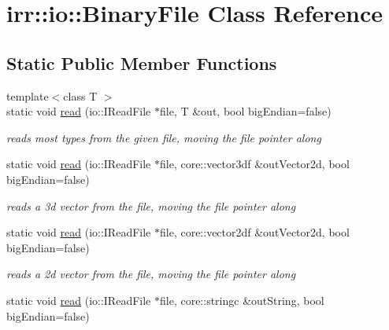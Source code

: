 \hypertarget{classirr_1_1io_1_1_binary_file}{\section{irr\-:\-:io\-:\-:Binary\-File Class Reference}
\label{classirr_1_1io_1_1_binary_file}
}
\subsection*{Static Public Member Functions}
\begin{DoxyCompactItemize}
\item 
\hypertarget{classirr_1_1io_1_1_binary_file_a1c616b172ba986fc3b56a2180666abc1}{{\footnotesize template$<$class T $>$ }\\static void \hyperlink{classirr_1_1io_1_1_binary_file_a1c616b172ba986fc3b56a2180666abc1}{read} (io\-::\-I\-Read\-File $\ast$file, T \&out, bool big\-Endian=false)}\label{classirr_1_1io_1_1_binary_file_a1c616b172ba986fc3b56a2180666abc1}

\begin{DoxyCompactList}\small\item\em reads most types from the given file, moving the file pointer along \end{DoxyCompactList}\item 
\hypertarget{classirr_1_1io_1_1_binary_file_af26d578fdd6a4bb3903e866c1802537f}{static void \hyperlink{classirr_1_1io_1_1_binary_file_af26d578fdd6a4bb3903e866c1802537f}{read} (io\-::\-I\-Read\-File $\ast$file, core\-::vector3df \&out\-Vector2d, bool big\-Endian=false)}\label{classirr_1_1io_1_1_binary_file_af26d578fdd6a4bb3903e866c1802537f}

\begin{DoxyCompactList}\small\item\em reads a 3d vector from the file, moving the file pointer along \end{DoxyCompactList}\item 
\hypertarget{classirr_1_1io_1_1_binary_file_ad33a0cf46e300b86d314564e4c9b894e}{static void \hyperlink{classirr_1_1io_1_1_binary_file_ad33a0cf46e300b86d314564e4c9b894e}{read} (io\-::\-I\-Read\-File $\ast$file, core\-::vector2df \&out\-Vector2d, bool big\-Endian=false)}\label{classirr_1_1io_1_1_binary_file_ad33a0cf46e300b86d314564e4c9b894e}

\begin{DoxyCompactList}\small\item\em reads a 2d vector from the file, moving the file pointer along \end{DoxyCompactList}\item 
\hypertarget{classirr_1_1io_1_1_binary_file_af6f58cf4535d0728d4b61a5b45ceda4c}{static void \hyperlink{classirr_1_1io_1_1_binary_file_af6f58cf4535d0728d4b61a5b45ceda4c}{read} (io\-::\-I\-Read\-File $\ast$file, core\-::stringc \&out\-String, bool big\-Endian=false)}\label{classirr_1_1io_1_1_binary_file_af6f58cf4535d0728d4b61a5b45ceda4c}


\end{DoxyCompactItemize}

